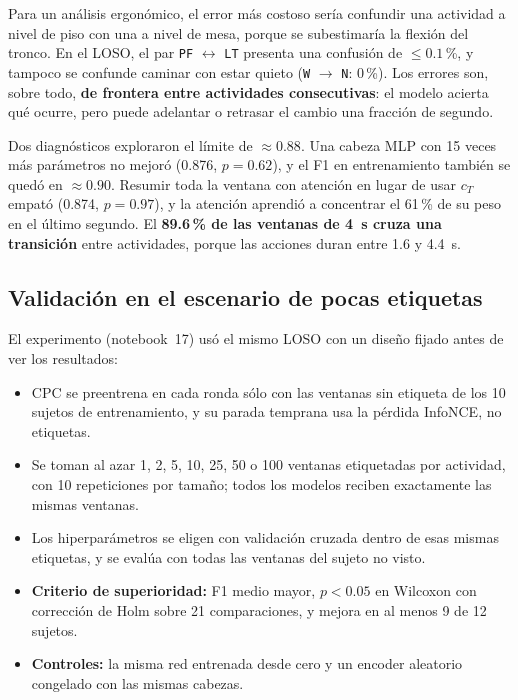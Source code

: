 \documentclass[letterpaper,11pt]{article}
\newcommand{\act}[1]{\texttt{#1}}
\begin{document}
Para un análisis ergonómico, el error más costoso sería confundir una actividad a nivel de piso con una a nivel de mesa, porque se subestimaría la flexión del tronco. En el LOSO, el par \act{PF} $\leftrightarrow$ \act{LT} presenta una confusión de $\le 0.1$\,\%, y tampoco se confunde caminar con estar quieto (\act{W} $\to$ \act{N}: 0\,\%). Los errores son, sobre todo, \textbf{de frontera entre actividades consecutivas}: el modelo acierta qué ocurre, pero puede adelantar o retrasar el cambio una fracción de segundo.

Dos diagnósticos exploraron el límite de $\approx 0.88$. Una cabeza MLP con 15 veces más parámetros no mejoró (0.876, $p = 0.62$), y el F1 en entrenamiento también se quedó en $\approx 0.90$. Resumir toda la ventana con atención en lugar de usar $c_T$ empató (0.874, $p = 0.97$), y la atención aprendió a concentrar el 61\,\% de su peso en el último segundo. El \textbf{89.6\,\% de las ventanas de 4~s cruza una transición} entre actividades, porque las acciones duran entre 1.6 y 4.4~s.

\subsection{Validación en el escenario de pocas etiquetas}
\label{sec:pocas}
El experimento (notebook~17) usó el mismo LOSO con un diseño fijado antes de ver los resultados:

\begin{itemize}
  \item CPC se preentrena en cada ronda sólo con las ventanas sin etiqueta de los 10 sujetos de entrenamiento, y su parada temprana usa la pérdida InfoNCE, no etiquetas.
  \item Se toman al azar 1, 2, 5, 10, 25, 50 o 100 ventanas etiquetadas por actividad, con 10 repeticiones por tamaño; todos los modelos reciben exactamente las mismas ventanas.
  \item Los hiperparámetros se eligen con validación cruzada dentro de esas mismas etiquetas, y se evalúa con todas las ventanas del sujeto no visto.
  \item \textbf{Criterio de superioridad:} F1 medio mayor, $p < 0.05$ en Wilcoxon con corrección de Holm sobre 21 comparaciones, y mejora en al menos 9 de 12 sujetos.
  \item \textbf{Controles:} la misma red entrenada desde cero y un encoder aleatorio congelado con las mismas cabezas.
\end{itemize}
\end{document}

